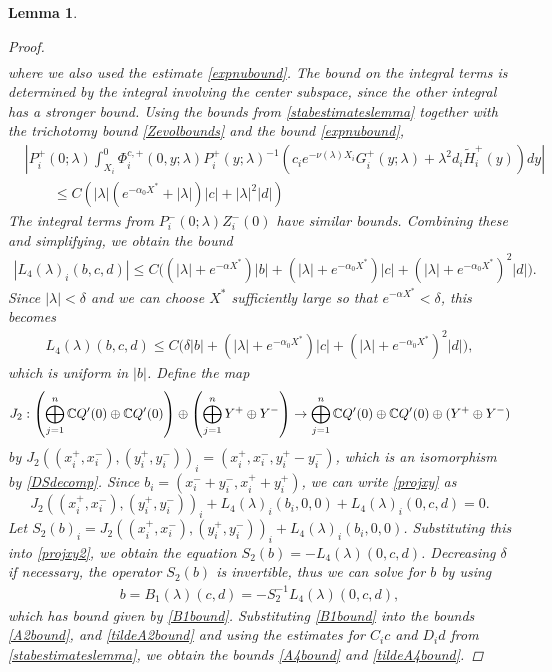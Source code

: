 \documentclass[12pt]{elsarticle}
\theoremstyle{plain}
\newtheorem{lemma}[theorem]{Lemma}
\theoremstyle{definition}
\theoremstyle{remark}
\numberwithin{theorem}{section}
\numberwithin{equation}{section}
\begin{document}
\begin{lemma}
\begin{proof}
\begin{align*}
\end{align*}
where we also used the estimate \cref{expnubound}. The bound on the integral terms is determined by the integral involving the center subspace, since the other integral has a stronger bound. Using the bounds from \cref{stabestimateslemma} together with the trichotomy bound \cref{Zevolbounds} and the bound \cref{expnubound}, 
\begin{align*}
&\left| P_i^+(0; \lambda) \int_{X_i}^0 \Phi_i^{c,+}(0, y; \lambda) P_i^+(y; \lambda)^{-1}( c_i e^{-\nu(\lambda)X_i} G_i^+(y; \lambda) + \lambda^2 d_i \tilde{H}_i^+(y)) dy  \right| \\
&\qquad \leq C \left( |\lambda|(e^{-\alpha_0 X^*} + |\lambda|)|c| + |\lambda|^2 |d| \right)
\end{align*}
The integral terms from $P_i^-(0; \lambda) Z_i^-(0)$ have similar bounds. Combining these and simplifying, we obtain the bound
\begin{align*}
|L_4(\lambda)_i(b, c, d)| \leq 
C\Big( (|\lambda| + e^{-\alpha X^*})|b| + (|\lambda|+e^{-\alpha_0 X^*})|c| + (|\lambda| + e^{-\alpha_0 X^*})^2 |d|  \Big).
\end{align*}
Since $|\lambda| < \delta$ and we can choose $X^*$ sufficiently large so that $e^{-\alpha X^*} < \delta$, this becomes
\begin{align*}
L_4(\lambda)(b, c, d) \leq 
C\Big( \delta |b| + (|\lambda|+e^{-\alpha_0 X^*})|c| + (|\lambda| + e^{-\alpha_0 X^*})^2 |d| \Big), 
\end{align*}
which is uniform in $|b|$. Define the map
\[
J_2: \left( \bigoplus_{j=1}^n \mathbb{C} Q'(0) \oplus \mathbb{C} Q'(0)  \right) \oplus
\left( \bigoplus_{j=1}^n Y^+ \oplus Y^- \right) 
\rightarrow \bigoplus_{j=1}^n \mathbb{C} Q'(0) \oplus \mathbb{C} Q'(0) \oplus (Y^+ \oplus Y^-)
\]
by $J_2( (x_i^+, x_i^-),(y_i^+, y_i^-))_i = ( x_i^+, x_i^-, y_i^+ - y_i^- )$, which is an isomorphism by \cref{DSdecomp}. Since $b_i = (x_i^- + y_i^-, x_i^+ + y_i^+)$, we can write \cref{projxy} as
\begin{equation}\label{projxy2}
J_2( (x_i^+, x_i^-),(y_i^+, y_i^-))_i 
+ L_4(\lambda)_i(b_i, 0, 0) + L_4(\lambda)_i(0, c, d) = 0.
\end{equation}
Let $S_2(b)_i = J_2( (x_i^+, x_i^-),(y_i^+, y_i^-))_i + L_4(\lambda)_i(b_i, 0, 0)$. Substituting this into \cref{projxy2}, we obtain the equation $S_2(b) = -L_4(\lambda)(0, c, d)$. Decreasing $\delta$ if necessary, the operator $S_2(b)$ is invertible, thus we can solve for $b$ by using
\begin{align}
b = B_1(\lambda)(c,d) 
= -S_2^{-1} L_4(\lambda)(0, c, d),
\end{align}
which has bound given by \cref{B1bound}. Substituting \cref{B1bound} into the bounds \cref{A2bound}, and \cref{tildeA2bound} and using the estimates for $C_i c$ and $D_i d$ from \cref{stabestimateslemma}, we obtain the bounds \cref{A4bound} and \cref{tildeA4bound}.
\end{proof}
\end{lemma}
\end{document}
